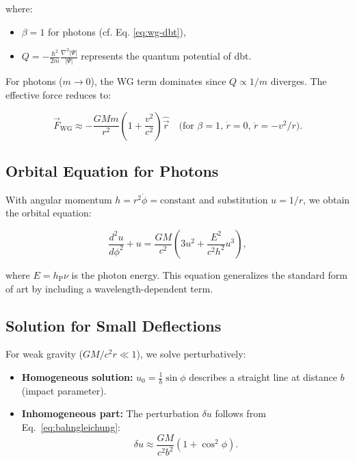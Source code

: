 where:
\begin{itemize}
\item $\beta = 1$ for photons (cf. Eq. \ref{eq:wg-dbt}),
\item $Q = -\frac{\hbar^2}{2m} \frac{\nabla^2 |\Psi|}{|\Psi|}$ represents the quantum potential of \gls{dbt}.
\end{itemize}

For photons ($m \to 0$), the WG term dominates since $Q \propto 1/m$ diverges. The effective force reduces to:

\begin{equation}
\vec{F}_{\text{WG}} \approx -\frac{GMm}{r^2} \left(1 + \frac{v^2}{c^2}\right) \hat{\vec{r}} \quad \text{(for $\beta = 1$, $\dot{r} = 0$, $\ddot{r} = -v^2/r$)}.
\end{equation}

\subsection{Orbital Equation for Photons}
With angular momentum $h = r^2 \dot{\phi} = \text{constant}$ and substitution $u = 1/r$, we obtain the orbital equation:

\begin{equation}
\frac{d^2 u}{d\phi^2} + u = \frac{GM}{c^2} \left(3u^2 + \frac{E^2}{c^2 h^2} u^3\right),
\label{eq:bahngleichung}
\end{equation}

where $E = h_{\text{P}} \nu$ is the photon energy. This equation generalizes the standard form of \gls{art} by including a wavelength-dependent term.

\subsection{Solution for Small Deflections}
For weak gravity ($GM/c^2 r \ll 1$), we solve perturbatively:

\begin{itemize}
\item \textbf{Homogeneous solution:} $u_0 = \frac{1}{b} \sin \phi$ describes a straight line at distance $b$ (impact parameter).
\item \textbf{Inhomogeneous part:} The perturbation $\delta u$ follows from Eq.~\ref{eq:bahngleichung}:
\begin{equation}
\delta u \approx \frac{GM}{c^2 b^2} (1 + \cos^2 \phi).
\end{equation}
\end{itemize}

